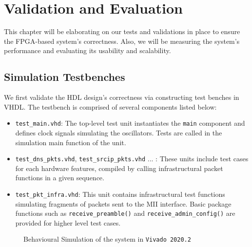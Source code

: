 \documentclass[a4paper]{report}
\newcommand{\proglang}{\textsf}
\newcommand{\code}{\texttt}
\begin{document}
\chapter{Validation and Evaluation}

This chapter will be elaborating on our tests and validations in place to ensure the FPGA-based system's correctness. Also, we will be measuring the system's performance and evaluating its usability and scalability. 

\section{Simulation Testbenches}
\label{section:validation-simulation}

We first validate the HDL design's correctness via constructing test benches in \proglang{VHDL}. The testbench is comprised of several components listed below:

\begin{itemize}
    \item \code{test\_main.vhd}: The top-level test unit instantiates the \code{main} component and defines clock signals simulating the oscillators. Tests are called in the simulation main function of the unit.
    \item \code{test\_dns\_pkts.vhd}, \code{test\_srcip\_pkts.vhd} ... : These units include test cases for each hardware features, compiled by calling infrastructural packet functions in a given sequence. 
    \item \code{test\_pkt\_infra.vhd}: This unit contains infrastructural test functions simulating fragments of packets sent to the MII interface. Basic package functions such as \code{receive\_preamble()} and \code{receive\_admin\_config()} are provided for higher level test cases.
\end{itemize}

\begin{figure}[h!]
  \caption{Behavioural Simulation of the system in \code{Vivado 2020.2}}
  \label{fig:behavioural-simulation-fpga}
\end{figure}
\end{document}
